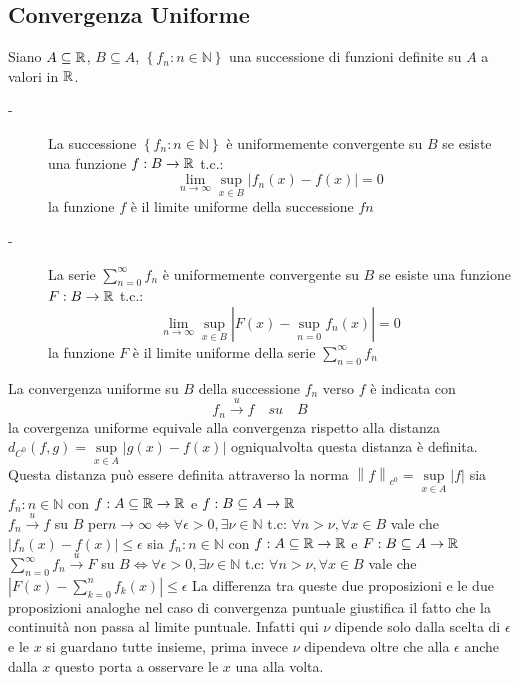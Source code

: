 \subsection{Convergenza Uniforme}
Siano $A\subseteq \mathbb{R}$, $B\subseteq A$, $\left\{f_n:n\in\mathbb{N}\right\}$ una successione di funzioni definite su $A$ a  valori in $ \mathbb{R}$.
\begin{description}
	\item[-] La successione $\left\{f_n:n\in\mathbb{N}\right\}$ è uniformemente convergente su $B$ se esiste una funzione $f:B\to \mathbb{R}$ t.c.:
	$$\lim\limits_{n\to\infty} \sup\limits_{x\in B}\left|f_n(x)-f(x)\right|=0$$
	la funzione $f$ è il limite uniforme della successione $fn$
	\item[-] La serie $\sum\limits_{n=0}^{\infty}f_n$ è uniformemente convergente su $B$ se esiste una funzione $F:B\to \mathbb{R}$ t.c.:
	$$\lim\limits_{n\to\infty} \sup\limits_{x\in B}\left|F(x)-\sup\limits_{n=0}f_n(x)\right|=0$$
	la funzione $F$ è il limite uniforme della serie $\sum\limits_{n=0}^{\infty}f_n$ 
\end{description}
\observation
La convergenza uniforme su $B$ della successione $f_n$ verso $f$ è indicata con
$$f_n\overset{u}{\to}f\quad su \quad B$$
\observation
la covergenza uniforme equivale alla convergenza rispetto alla distanza $d_{C^0}(f,g)=\sup\limits_{x\in A}\left|g(x)-f(x)\right|$ ogniqualvolta questa distanza è definita.\\
Questa distanza può essere definita attraverso la norma $\left\| f\right\|_{c^0}=\sup\limits_{x\in A}\left|f\right|$
\proposition
sia $f_n:n\in\mathbb{N}$ con $f:A\subseteq \mathbb{R}\to \mathbb{R}$ e $f:B\subseteq A \to  \mathbb{R}$\\
$f_n\overset{u}{\to}f$ su $B$ per$n\to\infty \Leftrightarrow \forall\epsilon >0, \exists\nu\in\mathbb{N}$  t.c: $\forall n>\nu, \forall x\in B$ vale che $\left| f_n(x)-f(x)\right|\le\epsilon$
\proposition
sia $f_n:n\in\mathbb{N}$ con $f:A\subseteq \mathbb{R}\to \mathbb{R}$ e $F:B\subseteq A \to  \mathbb{R}$\\
$\sum\limits_{n=0}^{\infty}f_n\overset{u}{\to}F$ su $B\Leftrightarrow \forall\epsilon >0, \exists\nu\in\mathbb{N}$  t.c: $\forall n>\nu, \forall x\in B$ vale che $\left| F(x)-\sum\limits_{k=0}^{n}f_k(x)\right|\le\epsilon$
\observation
La differenza tra queste due proposizioni e le due proposizioni analoghe nel caso di convergenza puntuale giustifica il fatto che la continuità non passa al limite puntuale. Infatti qui $\nu$ dipende solo dalla scelta di $\epsilon$ e le $x$ si guardano tutte insieme, prima invece $\nu$ dipendeva oltre che alla $\epsilon$ anche dalla $x$ questo porta a osservare le $x$ una alla volta.
